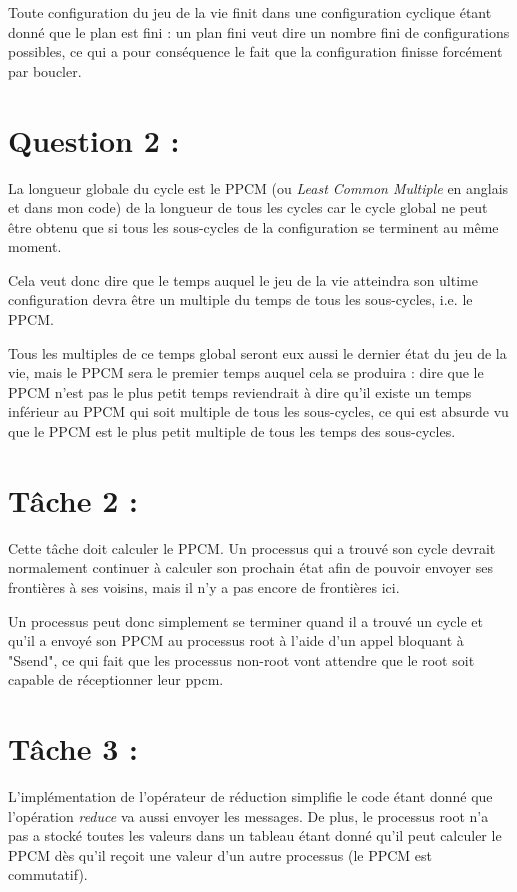 \documentclass{article}
\begin{document}
Toute configuration du jeu de la vie finit dans une configuration cyclique étant donné que le plan est fini : un plan fini veut dire un nombre fini de configurations possibles, ce qui a pour conséquence le fait que la configuration finisse forcément par boucler.

\section{Question 2 :}

La longueur globale du cycle est le PPCM (ou \textit{Least Common Multiple} en anglais et dans mon code) de la longueur de tous les cycles car le cycle global ne peut être obtenu que si tous les sous-cycles de la configuration se terminent au même moment.

Cela veut donc dire que le temps auquel le jeu de la vie atteindra son ultime configuration devra être un multiple du temps de tous les sous-cycles, i.e. le PPCM.

\medskip

Tous les multiples de ce temps global seront eux aussi le dernier état du jeu de la vie, mais le PPCM sera le premier temps auquel cela se produira : dire que le PPCM n'est pas le plus petit temps reviendrait à dire qu'il existe un temps inférieur au PPCM qui soit multiple de tous les sous-cycles, ce qui est absurde vu que le PPCM est le plus petit multiple de tous les temps des sous-cycles.

\section{Tâche 2 :}

Cette tâche doit calculer le PPCM.
Un processus qui a trouvé son cycle devrait normalement continuer à calculer son prochain état afin de pouvoir envoyer ses frontières à ses voisins, mais il n'y a pas encore de frontières ici.

Un processus peut donc simplement se terminer quand il a trouvé un cycle et qu'il a envoyé son PPCM au processus root à l'aide d'un appel bloquant à "Ssend", ce qui fait que les processus non-root vont attendre que le root soit capable de réceptionner leur ppcm.

\section{Tâche 3 :}

L'implémentation de l'opérateur de réduction simplifie le code étant donné que l'opération \textit{reduce} va aussi envoyer les messages.
De plus, le processus root n'a pas a stocké toutes les valeurs dans un tableau étant donné qu'il peut calculer le PPCM dès qu'il reçoit une valeur d'un autre processus (le PPCM est commutatif).
\end{document}
